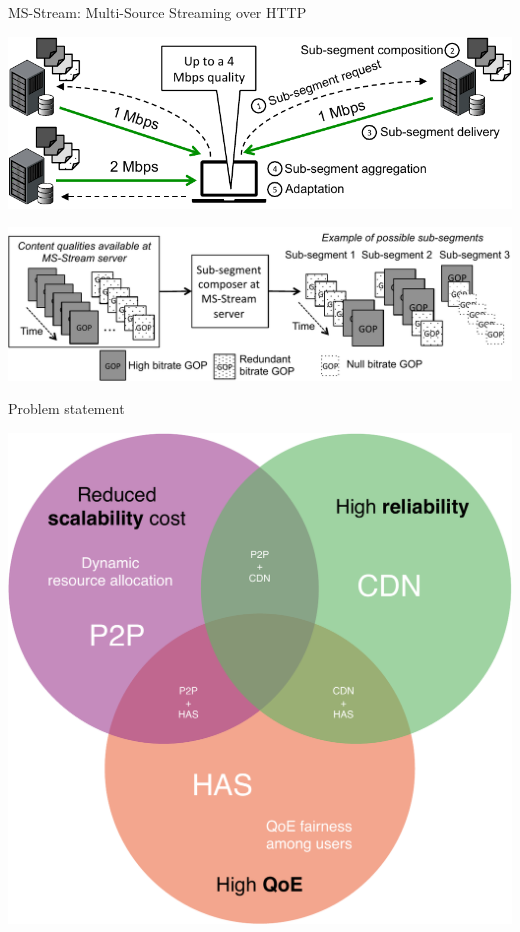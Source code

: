 \vfill
            
            \begin{block}{MS-Stream: Multi-Source Streaming over HTTP}
            
            \centering
            
            \includegraphics[width=.925\textwidth]{sample/msstream_archi.pdf}
            
            \includegraphics[width=.925\textwidth]{sample/chunk2.pdf}
            
            \end{block}
            
            \vfill
            
            \begin{block}{Problem statement}
            
            \centering
            
            \includegraphics[width=.5\textwidth]{sample/SotA-cropped.pdf}
            
            \end{block}